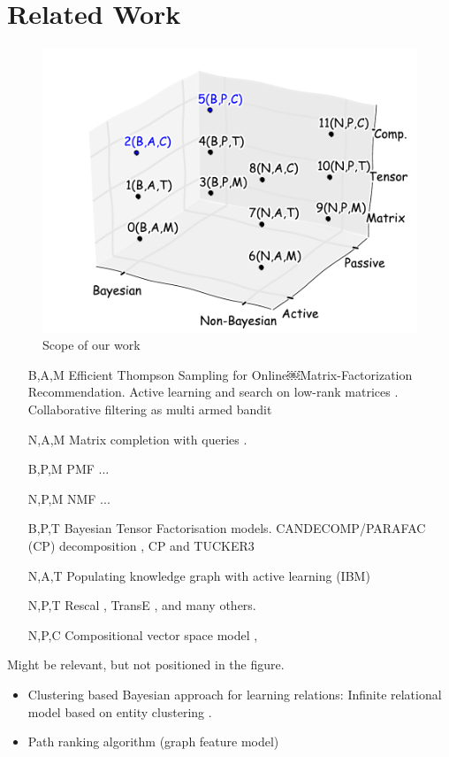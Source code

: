 
\section{Related Work}

\begin{figure}[t]
	\centering
	\includegraphics[width=\linewidth]{images/3d_plot.pdf}			
	\caption{\label{fig:related3d}Scope of our work}
\end{figure}

\begin{itemize}
\item [B,A,M] Efficient Thompson Sampling for Online￼Matrix-Factorization Recommendation\cite{kawale2015efficient}. Active learning and search on low-rank matrices \cite{sutherland2013active}. Collaborative filtering as multi armed bandit \cite{guillou2015collaborative}
\item [N,A,M] Matrix completion with queries \cite{ruchansky2015matrix}.
\item [B,P,M] PMF \cite{mnih2007probabilistic} ...
\item [N,P,M] NMF\cite{lee1999learning} ...
\item [B,P,T] Bayesian Tensor Factorisation models. CANDECOMP/PARAFAC (CP) decomposition \cite{xiong2010temporal,schmidt2009probabilistic}, CP and TUCKER3 \cite{yilmaz2012algorithms}
\item [N,A,T] Populating knowledge graph with active learning (IBM) \cite{kajino2015active}
\item [N,P,T] Rescal \cite{nickel2011three}, TransE \cite{bordes2013translating}, and many others.
\item [N,P,C] Compositional vector space model \cite{Neelakantan2015}, 
\end{itemize}

Might be relevant, but not positioned in the figure.
\begin{itemize}
\item Clustering based Bayesian approach for learning relations: Infinite relational model based on entity clustering \cite{kemp2006learning}.
\item Path ranking algorithm (graph feature model) \cite{Lao2010}
\end{itemize}
